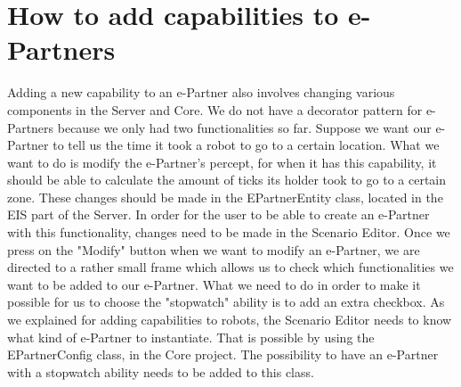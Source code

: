 \documentclass{article}
\begin{document}
\section*{How to add capabilities to e-Partners}
Adding a new capability to an e-Partner also involves changing various components in the Server and Core. We do not have a decorator pattern for e-Partners because we only had two functionalities so far. 
\newline
Suppose we want our e-Partner to tell us the time it took a robot to go to a certain location. What we want to do is modify the e-Partner's percept, for when it has this capability, it should be able to calculate the amount of ticks its holder took to go to a certain zone. These changes should be made in the EPartnerEntity class, located in the EIS part of the Server. 
\newline
\newline 
In order for the user to be able to create an e-Partner with this functionality, changes need to be made in the Scenario Editor. Once we press on the "Modify" button when we want to modify an e-Partner, we are directed to a rather small frame which allows us to check which functionalities we want to be added to our e-Partner. What we need to do in order to make it possible for us to choose the "stopwatch" ability is to add an extra checkbox. 
\newline
As we explained for adding capabilities to robots, the Scenario Editor needs to know what kind of e-Partner to instantiate. That is possible by using the EPartnerConfig class, in the Core project. The possibility to have an e-Partner with a stopwatch ability needs to be added to this class. 
\end{document}
